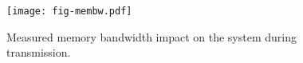 \begin{figure}[t]
\texttt{[image: fig-membw.pdf]}
\caption{Measured memory bandwidth impact on the system during transmission.}
\label{fig:membw}
\end{figure}

